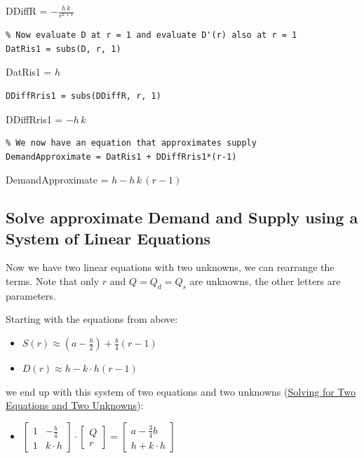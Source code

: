 \documentclass[
]{book}
\providecommand{\tightlist}{%
  \setlength{\itemsep}{0pt}\setlength{\parskip}{0pt}}
\begin{document}
DDiffR = \(\displaystyle -\frac{h\,k}{r^{k+1} }\)

\begin{verbatim}
% Now evaluate D at r = 1 and evaluate D'(r) also at r = 1
DatRis1 = subs(D, r, 1)
\end{verbatim}

DatRis1 = \(\displaystyle h\)

\begin{verbatim}
DDiffRris1 = subs(DDiffR, r, 1)
\end{verbatim}

DDiffRris1 = \(\displaystyle -h\,k\)

\begin{verbatim}
% We now have an equation that approximates supply
DemandApproximate = DatRis1 + DDiffRris1*(r-1)
\end{verbatim}

DemandApproximate = \(\displaystyle h-h\,k\,{\left(r-1\right)}\)

\hypertarget{solve-approximate-demand-and-supply-using-a-system-of-linear-equations}{%
\subsection{Solve approximate Demand and Supply using a System of Linear Equations}\label{solve-approximate-demand-and-supply-using-a-system-of-linear-equations}}

Now we have two linear equations with two unknowns, we can rearrange the
terms. Note that only \(r\) and \(Q=Q_d =Q_s\) are unknowns, the other
letters are parameters.

Starting with the equations from above:

\begin{itemize}
\item
  \(\displaystyle S(r)\approx (a-\frac{b}{2})+\frac{b}{4}(r-1)\)
\item
  \(\displaystyle D(r)\approx h-k\cdot h(r-1)\)
\end{itemize}

we end up with this system of two equations and two unknowns (\href{https://fanwangecon.github.io/Math4Econ/matrix_system_of_equations/matrix_linear_system_2.html}{Solving
for Two Equations and Two
Unknowns}):

\begin{itemize}
\tightlist
\item
  \(\displaystyle \left\lbrack \begin{array}{cc} 1 & -\frac{b}{4}\\ 1 & k\cdot h \end{array}\right\rbrack \cdot \left\lbrack \begin{array}{c} Q\\ r \end{array}\right\rbrack =\left\lbrack \begin{array}{c} a-\frac{3}{4}b\\ h+k\cdot h \end{array}\right\rbrack\)
\end{itemize}
\end{document}
